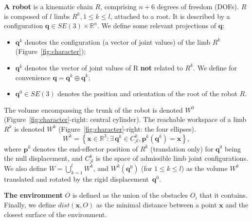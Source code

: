 \medskip
\textbf{A robot} is a kinematic chain $R$, comprising \mbox{$n + 6$} degrees of freedom (DOFs).
$R$ is composed of $l$ limbs $R^k, 1 \leq k \leq l$, attached to a root.
It is described by a configuration $\mathbf{q} \in SE(3) \times \mathbb{R}^n$.
We define some relevant projections of $\mathbf{q}$:
\begin{itemize}
	\item $\mathbf{q}^k$ denotes the configuration (a vector of joint values) of the limb $R^k$ (Figure~\ref{fig:character});
	\item $\mathbf{q}^{\overline{k}}$ denotes the vector of joint values of R \textbf{not} related to $R^k$. We define for convenience \mbox{$\mathbf{q}= \mathbf{q}^k \oplus \mathbf{q}^{\overline{k}}$}; %
	\item $\mathbf{q}^{0}\in SE(3)$ denotes the position and orientation of the root of the robot $R$.
\end{itemize}

\medskip
The volume encompassing the trunk of the robot is denoted $W^0$ (Figure~\ref{fig:character}-right: central cylinder). The reachable workspace of a limb $R^k$ is denoted $W^k$ (Figure~\ref{fig:character}-right: the four ellipses). 
\begin{equation}
  W^k = \left\{ {\mathbf{x} \in \mathbb{R}^3: \exists \, \mathbf{q}^k \in C^k_{jl}, \mathbf{p}^k(\mathbf{q}^k) = \mathbf{x} } \right\},
\end{equation}
where $\mathbf{p}^k$ denotes the end-effector position of $R^k$ (translation only) for $\mathbf{q}^0$ being the null displacement, and  $C^k_{jl}$ is the space
of admissible limb joint configurations. We also define $W = \bigcup_{k=1}^{l}W^k$, and
$W^k(\mathbf{q}^{0})$ (for $1 \leq k \leq l$) as the volume $W^k$ translated and rotated by the rigid displacement~$\mathbf{q}^{0}$.

\medskip
\textbf{The environment} $O$ is defined as the union of the obstacles $O_i$ that it contains.
Finally, we define $dist(\mathbf{x}, O)$ as the minimal distance between a point $\mathbf{x}$ and the closest surface of the environment.
